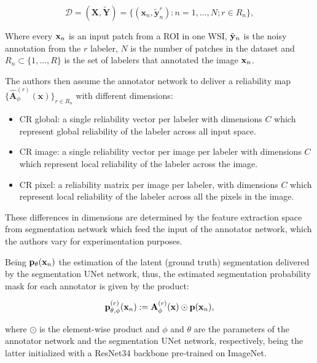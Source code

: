\begin{equation}
  \label{eq:input_data}
  \mathcal{D} = (\mathbf{X}, \tilde{\mathbf{Y}}) = \{ (\mathbf{x}_n,
  \tilde{\mathbf{y}}_n^r) : n = 1, \dots, N; r \in R_n \},
\end{equation}

Where every $\mathbf{x}_n$ is an input patch from a \gls{ROI} in one \gls{WSI},
$\tilde{\mathbf{y}}_n$ is the noisy annotation from the $r$ labeler, $N$
is the number of patches in the dataset and $R_n \subset \{1, \dots,
R\}$ is the set of labelers that annotated the image $\mathbf{x}_n$.

The authors then assume the annotator network to deliver a
reliability map $\{\hat{\mathbf{A}}^{(r)}_{\phi}(\mathbf{x}) \}_{r
\in R_n}$ with different dimensions:

\begin{itemize}
  \item CR global: a single reliability vector per labeler with
    dimensions $C$ which represent global reliability of the labeler
    across all input space.
  \item CR image: a single reliability vector per image per labeler
    with dimensions $C$ which represent local reliability of the labeler
    across the image.
  \item CR pixel: a reliability matrix per image per labeler,
    with dimensions $C$ which represent local reliability of the labeler
    across all the pixels in the image.
\end{itemize}

These differences in dimensions are determined by the feature
extraction space from segmentation network which feed the input of the
annotator network, which the authors vary for experimentation purposes.

Being $\mathbf{p}_\theta(\mathbf{x}_n)$ the estimation of the latent (ground
truth) segmentation delivered by the segmentation UNet network, thus,
the estimated segmentation probability mask for each annotator is
given by the product:

\begin{equation}
  \label{eq:estimated_segmentation}
  \mathbf{p}^{(r)}_{\theta,\phi}(\mathbf{x}_n) :=
  \mathbf{A}^{(r)}_{\phi}(\mathbf{x}) \odot \mathbf{p}(\mathbf{x}_n),
\end{equation}

where $\odot$ is the element-wise product and $\phi$ and $\theta$ are
the parameters of the annotator network and the segmentation UNet
network, respectively, being the latter initialized with a ResNet34 backbone
pre-trained on ImageNet.

